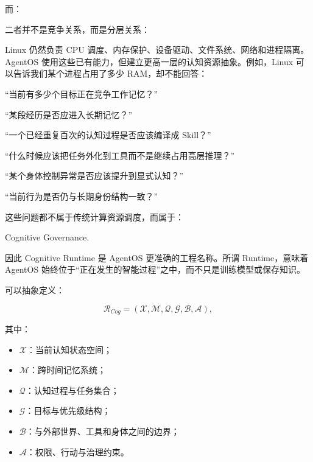 而：

\begin{statementbox}
\centering
{}
\end{statementbox}

二者并不是竞争关系，而是分层关系：

\begin{statementbox}
\centering
{}
\end{statementbox}

Linux 仍然负责 CPU 调度、内存保护、设备驱动、文件系统、网络和进程隔离。AgentOS 使用这些已有能力，但建立更高一层的认知资源抽象。例如，Linux 可以告诉我们某个进程占用了多少 RAM，却不能回答：

“当前有多少个目标正在竞争工作记忆？”

“某段经历是否应进入长期记忆？”

“一个已经重复百次的认知过程是否应该编译成 Skill？”

“什么时候应该把任务外化到工具而不是继续占用高层推理？”

“某个身体控制异常是否应该提升到显式认知？”

“当前行为是否仍与长期身份结构一致？”

这些问题都不属于传统计算资源调度，而属于：

\begin{statementbox}
Cognitive Governance.
\end{statementbox}

因此 Cognitive Runtime 是 AgentOS 更准确的工程名称。所谓 Runtime，意味着 AgentOS 始终位于“正在发生的智能过程”之中，而不只是训练模型或保存知识。

可以抽象定义：

\[
\mathcal{R}_{Cog}
=
(
\mathcal{X},
\mathcal{M},
\mathcal{Q},
\mathcal{G},
\mathcal{B},
\mathcal{A}
),
\]

其中：

\begin{itemize}
    \item $\mathcal{X}$：当前认知状态空间；
    \item $\mathcal{M}$：跨时间记忆系统；
    \item $\mathcal{Q}$：认知过程与任务集合；
    \item $\mathcal{G}$：目标与优先级结构；
    \item $\mathcal{B}$：与外部世界、工具和身体之间的边界；
    \item $\mathcal{A}$：权限、行动与治理约束。
\end{itemize}

